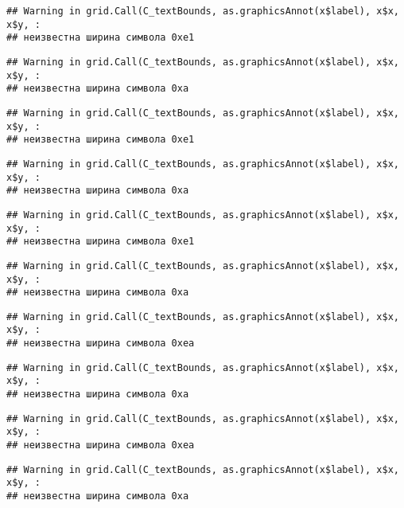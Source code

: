 \documentclass[
]{article}
\begin{document}
\begin{verbatim}
## Warning in grid.Call(C_textBounds, as.graphicsAnnot(x$label), x$x, x$y, :
## неизвестна ширина символа 0xe1
\end{verbatim}

\begin{verbatim}
## Warning in grid.Call(C_textBounds, as.graphicsAnnot(x$label), x$x, x$y, :
## неизвестна ширина символа 0xa
\end{verbatim}

\begin{verbatim}
## Warning in grid.Call(C_textBounds, as.graphicsAnnot(x$label), x$x, x$y, :
## неизвестна ширина символа 0xe1
\end{verbatim}

\begin{verbatim}
## Warning in grid.Call(C_textBounds, as.graphicsAnnot(x$label), x$x, x$y, :
## неизвестна ширина символа 0xa
\end{verbatim}

\begin{verbatim}
## Warning in grid.Call(C_textBounds, as.graphicsAnnot(x$label), x$x, x$y, :
## неизвестна ширина символа 0xe1
\end{verbatim}

\begin{verbatim}
## Warning in grid.Call(C_textBounds, as.graphicsAnnot(x$label), x$x, x$y, :
## неизвестна ширина символа 0xa
\end{verbatim}

\begin{verbatim}
## Warning in grid.Call(C_textBounds, as.graphicsAnnot(x$label), x$x, x$y, :
## неизвестна ширина символа 0xea
\end{verbatim}

\begin{verbatim}
## Warning in grid.Call(C_textBounds, as.graphicsAnnot(x$label), x$x, x$y, :
## неизвестна ширина символа 0xa
\end{verbatim}

\begin{verbatim}
## Warning in grid.Call(C_textBounds, as.graphicsAnnot(x$label), x$x, x$y, :
## неизвестна ширина символа 0xea
\end{verbatim}

\begin{verbatim}
## Warning in grid.Call(C_textBounds, as.graphicsAnnot(x$label), x$x, x$y, :
## неизвестна ширина символа 0xa
\end{verbatim}
\end{document}
